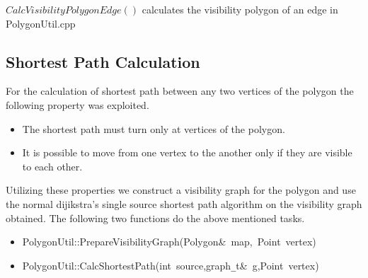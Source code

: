 \documentclass[a4paper,10pt]{article}
\begin{document}
 $CalcVisibilityPolygonEdge()$ calculates the visibility polygon of an edge in PolygonUtil.cpp


\subsection{Shortest Path Calculation}
For the calculation of shortest path between any two vertices of the polygon the following property was exploited.
\begin{itemize}
 \item The shortest path must turn only at vertices of the polygon.
 \item It is possible to move from one vertex to the another only if they are visible to each other.
\end{itemize}

Utilizing these properties we construct a visibility graph for the polygon and use the normal dijikstra's single source shortest path
 algorithm on the visibility graph obtained. The following two functions do the above mentioned tasks.

\begin{itemize}

\item

{
\noindent \ttfamily
\noindent \ttfamily
\noindent \ttfamily
\noindent \ttfamily
\jttstylek PolygonUtil::PrepareVisibilityGraph\jttstylei (\jttstylek Polygon\&~map,~Point~vertex\jttstylei [])\\

}


\item

{
\noindent \ttfamily
\jttstylek PolygonUtil::CalcShortestPath\jttstylei (\jttstylej int~\jttstylek source,graph\verb#_#t\&~g,Point~vertex\jttstylei [])\\
\noindent \ttfamily
}

\end{itemize}
\end{document}
